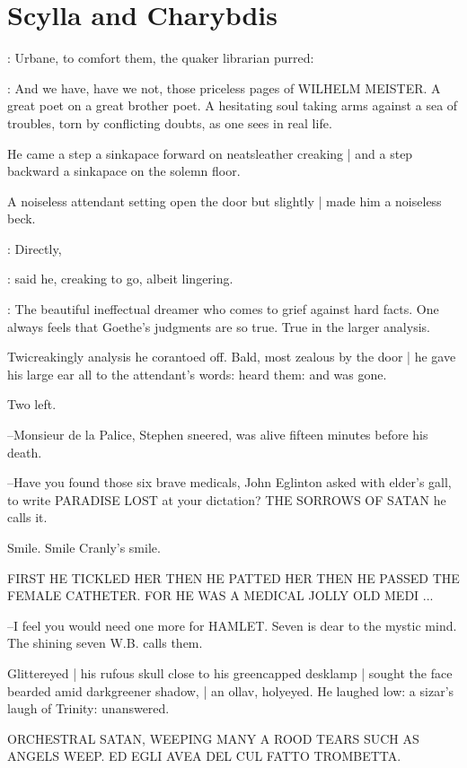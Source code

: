 \section*{Scylla and Charybdis}

:
Urbane, to comfort them,
the quaker librarian purred:

\librarian:
And we have, have we not, those priceless pages of WILHELM MEISTER.
A great poet on a great brother poet.
A hesitating soul taking arms against a sea of troubles,
torn by conflicting doubts,
as one sees in real life.

He came a step a sinkapace forward
on neatsleather creaking |
and a step backward a sinkapace
on the solemn floor.

A noiseless attendant setting open the door but slightly |
made him a noiseless beck.

\librarian:
Directly,

:
said he,
creaking to go, albeit lingering.

\librarian:
The beautiful ineffectual dreamer who comes to grief against hard facts.
One always feels that Goethe's judgments are so true.
True in the larger analysis.

Twicreakingly analysis he corantoed off.
Bald, most zealous by the door |
he gave his large ear all to the attendant's words:
heard them: and was gone.

Two left.

--Monsieur de la Palice,
Stephen sneered, was alive fifteen minutes before his death.

--Have you found those six brave medicals,
John Eglinton asked with elder's gall,
to write PARADISE LOST at your dictation?
THE SORROWS OF SATAN he calls it.

Smile. Smile Cranly's smile.


    FIRST HE TICKLED HER
    THEN HE PATTED HER
    THEN HE PASSED THE FEMALE CATHETER.
    FOR HE WAS A MEDICAL
    JOLLY OLD MEDI ...


--I feel you would need one more for HAMLET.
Seven is dear to the mystic mind.
The shining seven W.B. calls them.

Glittereyed |
his rufous skull close to his greencapped desklamp |
sought the face bearded amid darkgreener shadow, |
an ollav, holyeyed.
He laughed low: a sizar's laugh of Trinity: unanswered.


    ORCHESTRAL SATAN, WEEPING MANY A ROOD
    TEARS SUCH AS ANGELS WEEP.
    ED EGLI AVEA DEL CUL FATTO TROMBETTA.


